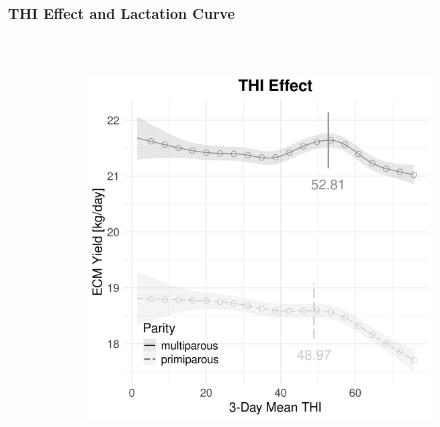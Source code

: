 \newpage
\paragraph{THI Effect and Lactation Curve} \quad \\
\begin{figure}[H]
    \centering
    \begin{subfigure}[b]{0.45\textwidth}
        \centering
        \includegraphics[width=\textwidth]{thesis/figures/models/ecm/after2010/si_ecm_after2010/si_ecm_after2010_marginal_thi_milk_combined.png}
    \end{subfigure}
    \hspace{0.05\textwidth} %
    \begin{subfigure}[b]{0.45\textwidth}
        \centering

\end{subfigure}
\end{figure}
